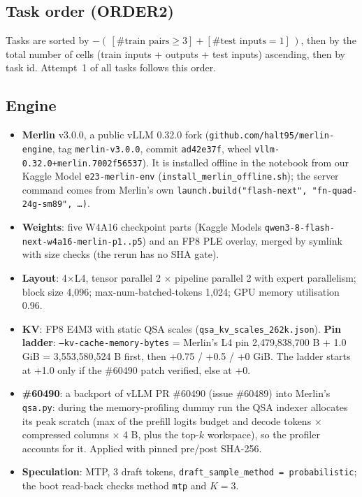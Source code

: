 \subsection{Task order (ORDER2)}
Tasks are sorted by $-(\,[\#\text{train pairs}\ge 3] + [\#\text{test inputs} = 1]\,)$, then by the total number of cells (train inputs + outputs + test inputs) ascending, then by task id. Attempt~1 of all tasks follows this order.

\subsection{Engine}
\begin{itemize}[leftmargin=*,itemsep=1pt]
\item \textbf{Merlin} v3.0.0, a public vLLM 0.32.0 fork (\texttt{github.com/halt95/merlin-engine}, tag \texttt{merlin-v3.0.0}, commit \texttt{ad42e37f}, wheel \texttt{vllm-0.32.0+merlin.7002f56537}). It is installed offline in the notebook from our Kaggle Model \texttt{e23-merlin-env} (\texttt{install\_merlin\_offline.sh}); the server command comes from Merlin's own \texttt{launch.build("flash-next", "fn-quad-24g-sm89", \dots)}.
\item \textbf{Weights}: five W4A16 checkpoint parts (Kaggle Models \texttt{qwen3-8-flash-next-w4a16-merlin-p1..p5}) and an FP8 PLE overlay, merged by symlink with size checks (the rerun has no SHA gate).
\item \textbf{Layout}: 4$\times$L4, tensor parallel 2 $\times$ pipeline parallel 2 with expert parallelism; block size 4{,}096; max-num-batched-tokens 1{,}024; GPU memory utilisation 0.96.
\item \textbf{KV}: FP8 E4M3 with static QSA scales (\texttt{qsa\_kv\_scales\_262k.json}). \textbf{Pin ladder}: \texttt{--kv-cache-memory-bytes} = Merlin's L4 pin 2{,}479{,}838{,}700 B + 1.0 GiB = 3{,}553{,}580{,}524 B first, then +0.75 / +0.5 / +0 GiB. The ladder starts at +1.0 only if the \#60490 patch verified, else at +0.
\item \textbf{\#60490}: a backport of vLLM PR \#60490 (issue \#60489) into Merlin's \texttt{qsa.py}: during the memory-profiling dummy run the QSA indexer allocates its peak scratch (max of the prefill logits budget and decode tokens $\times$ compressed columns $\times$ 4 B, plus the top-$k$ workspace), so the profiler accounts for it. Applied with pinned pre/post SHA-256.
\item \textbf{Speculation}: MTP, 3 draft tokens, \texttt{draft\_sample\_method = probabilistic}; the boot read-back checks method \texttt{mtp} and $K=3$.

\end{itemize}
